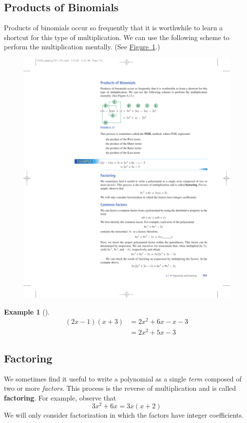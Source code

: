 \documentclass[10pt,]{book}
\newcommand{\terminology}[1]{\textbf{#1}}
\theoremstyle{plain}
\theoremstyle{definition}
\theoremstyle{definition}
\newtheorem{example}[theorem]{Example}
\theoremstyle{definition}
\numberwithin{equation}{part}
\newcommand{\amp}{&}
\begin{document}
\subsection[{Products of Binomials}]{Products of Binomials}\label{subsection-28}
Products of binomials occur so frequently that it is worthwhile to learn a shortcut for this type of multiplication. We can use the following scheme to perform the multiplication mentally. (See \hyperref[fig-FOIL]{Figure~\ref{fig-FOIL}}.) \leavevmode%
\begin{figure}
\centering
\includegraphics[width=0.6\linewidth]{images/fig-FOIL}
\caption{\label{fig-FOIL}}
\end{figure}
%
\begin{example}[]\label{example-45}
%
\begin{align*}
(2x − 1)(x + 3) \amp = 2x^2 + 6x − x − 3\\
\amp = 2x^2 + 5x − 3
\end{align*}
%
\end{example}
\typeout{************************************************}
\typeout{************************************************}
\subsection[{Factoring}]{Factoring}\label{subsection-29}
We sometimes find it useful to write a polynomial as a single \emph{term} composed of two or more \emph{factors}. This process is the reverse of multiplication and is called \terminology{factoring}. For example, observe that%
\begin{equation*}
3x^2 + 6x = 3x(x + 2)
\end{equation*}
We will only consider factorization in which the factors have integer coefficients.%
\typeout{************************************************}
\typeout{************************************************}
\end{document}
